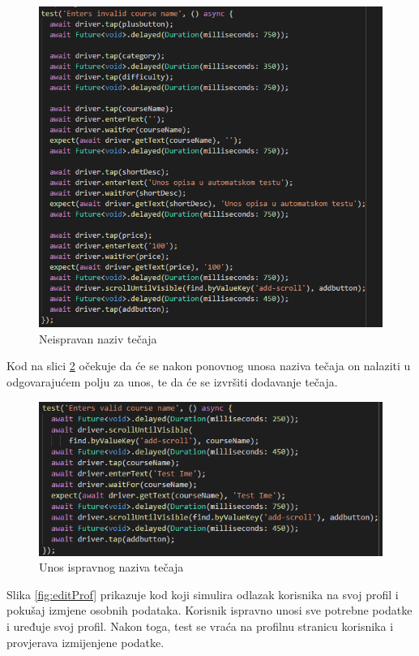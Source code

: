 			\begin{figure}[h]
				\includegraphics[scale=0.75]{slike/wrongName.PNG}
				\centering
				\caption{Neispravan naziv tečaja}
				\label{fig:wrongName}
			\end{figure}
			
			
			\eject
			
			Kod na slici \ref{fig:validName} očekuje da će se nakon ponovnog unosa naziva tečaja on nalaziti u odgovarajućem polju za unos, te da će se izvršiti dodavanje tečaja.
			
			\begin{figure}[h]
				\includegraphics[scale=0.70]{slike/validName.PNG}
				\centering
				\caption{Unos ispravnog naziva tečaja}
				\label{fig:validName}
			\end{figure}
			
			Slika \ref{fig:editProf} prikazuje kod koji simulira odlazak korisnika na svoj profil i pokušaj izmjene osobnih podataka.
			Korisnik ispravno unosi sve potrebne podatke i uređuje svoj profil. Nakon toga, test se vraća na profilnu stranicu korisnika i provjerava izmijenjene podatke.
			
